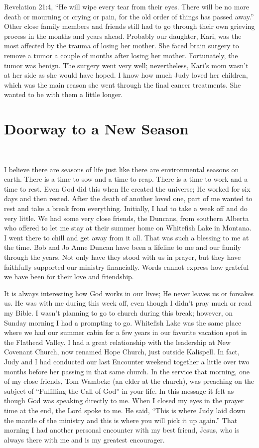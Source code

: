 \documentclass[oneside]{book}
\begin{document}
Revelation 21:4, “He will wipe every tear from their eyes. There will be no more death or mourning or crying or pain, for the old order of things has passed away.”
Other close family members and friends still had to go through their own grieving process in the months and years ahead. Probably our daughter, Kari, was the most affected by the trauma of losing her mother. She faced brain surgery to remove a tumor a couple of months after losing her mother. Fortunately, the tumor was benign. The surgery went very well; nevertheless, Kari’s mom wasn’t at her side as she would have hoped. I know how much Judy loved her children, which was the main reason she went through the final cancer treatments. She wanted to be with them a little longer.


\section{Doorway to a New Season}
\

I believe there are seasons of life just like there are environmental seasons on earth. There is a time to sow and a time to reap. There is a time to work and a time to rest. Even God did this when He created the universe; He worked for six days and then rested. After the death of another loved one, part of me wanted to rest and take a break from everything. Initially, I had to take a week off and do very little. We had some very close friends, the Duncans, from southern Alberta who offered to let me stay at their summer home on Whitefish Lake in Montana. I went there to chill and get away from it all. That was such a blessing to me at the time. Bob and Jo Anne Duncan have been a lifeline to me and our family through the years. Not only have they stood with us in prayer, but they have faithfully supported our ministry financially. Words cannot express how grateful we have been for their love and friendship.

It is always interesting how God works in our lives; He never leaves us or forsakes us. He was with me during this week off, even though I didn’t pray much or read my Bible. I wasn’t planning to go to church during this break; however, on Sunday morning I had a prompting to go. Whitefish Lake was the same place where we had our summer cabin for a few years in our favorite vacation spot in the Flathead Valley. I had a great relationship with the leadership at New Covenant Church, now renamed Hope Church, just outside Kalispell. In fact, Judy and I had conducted our last Encounter weekend together a little over two months before her passing in that same church. In the service that morning, one of my close friends, Tom Wambeke (an elder at the church), was preaching on the subject of “Fulfilling the Call of God” in your life. In this message it felt as though God was speaking directly to me. When I closed my eyes in the prayer time at the end, the Lord spoke to me. He said, “This is where Judy laid down the mantle of the ministry and this is where you will pick it up again.” That morning I had another personal encounter with my best friend, Jesus, who is always there with me and is my greatest encourager.
\end{document}
